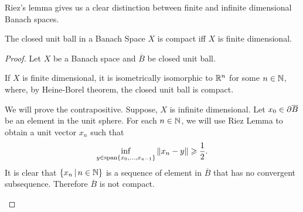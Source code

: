 \documentclass{article}
\begin{document}
Riez's lemma gives us a clear distinction between finite and infinite dimensional Banach spaces. 
\begin{mdframed}
\begin{cor}
The closed unit ball in a Banach Space $X$ is compact iff $X$ is finite dimensional. 
\end{cor}
\begin{proof}
Let $X$ be a Banach space and $\overline{B}$ be closed unit ball. 
\begin{case}[ $\Longleftarrow$ ] If $X$ is finite dimensional, it is isometrically isomorphic to $\R^n$ for some $n \in \N$, where, by Heine-Borel theorem, the closed unit ball is compact. 
\end{case}


\begin{case}[$\implies$] We will prove the contrapositive. Suppose, $X$ is infinite dimensional. Let $x_0 \in \p \overline{B}$ be an element in the unit sphere. For each $n \in \N$, we will use Riez Lemma to obtain a unit vector $x_n$ such that 
$$\inf_{y \in \mathrm{span}\set{x_0, \dots, x_{n - 1}}} \norm[x_n - y] \geq \frac{1}{2}. $$
It is clear that $\set{x_n \wh n \in \N}$ is a sequence of element in $\overline{B}$ that has no convergent subsequence. Therefore $\overline{B}$ is not compact. 
\end{case}
\end{proof}
\end{mdframed}






\end{document}
